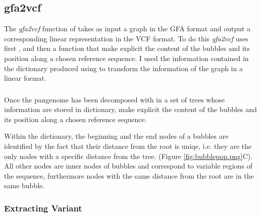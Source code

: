 







\subsection{gfa2vcf}
The \textit{gfa2vcf} function of \vgp takes as input a graph in the GFA format and output a corresponding linear representation in the VCF format. To do this \textit{gfa2vcf} uses first \bbp, and then \bbc a function that make explicit the content of the bubbles and its position along a chosen reference sequence.    
I used the information contained in the dictionary produced using \bbp to transform the information of the graph in a linear format. 


\setcounter{secnumdepth}{3}
\subsubsection{\bbc}
Once the pangenome has been decomposed with \bbp in a set of trees whose information are stored in dictionary, \bbp make explicit the content of the bubbles and its position along a chosen reference sequence.    

Within the dictionary, the beginning and the end nodes of a bubbles are identified by the fact that their distance from the root is uniqe, i.e. they are the only nodes with a specific distance from the tree. (Figure \ref{fig:bubblepop.png}C). All other nodes are  inner nodes of bubbles and correspond to variable regions of the sequence, furthermore nodes with the same distance from the root are in the same bubble. 





\subsubsection{Extracting Variant}

